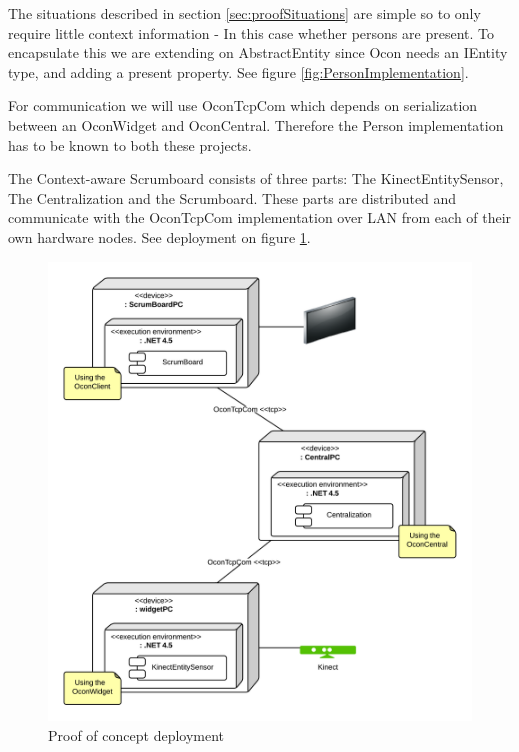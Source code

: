\documentclass[../report.tex]{subfiles}
\begin{document}
The situations described in section \ref{sec:proofSituations} are simple so to only require little context information - In this case whether persons are present. To encapsulate this we are extending on AbstractEntity since Ocon needs an IEntity type, and adding a present property. See figure \ref{fig:PersonImplementation}. 


For communication we will use OconTcpCom which depends on serialization between an OconWidget and OconCentral. Therefore the Person implementation has to be known to both these projects.



The Context-aware Scrumboard consists of three parts: The KinectEntitySensor, The Centralization and the Scrumboard. These parts are distributed and communicate with the OconTcpCom implementation over LAN from each of their own hardware nodes. See deployment on figure \ref{fig:ProofofConceptDeployment}.


\begin{figure}[H]
\begin{center}
\includegraphics[width=\linewidth]{./ProofOfConceptDeployment.png}
\caption{Proof of concept deployment}
\end{center}
\label{fig:ProofofConceptDeployment}
\end{figure}
\end{document}
